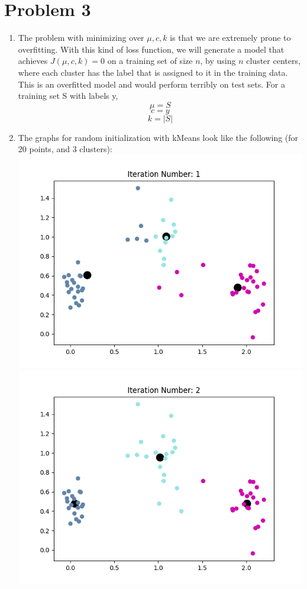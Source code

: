 \documentclass[11pt]{article}
\begin{document}
\section{Problem 3}
\begin{enumerate}
\item 
The problem with minimizing over $\mu, c, k$ is that we are extremely prone to overfitting. With this kind of
loss function, we will generate a model that achieves $J(\mu, c, k) = 0$ on a training set of size $n$, by 
using $n$ cluster centers, where each cluster has the label that is assigned to it in the training data. This
is an overfitted model and would perform terribly on test sets. \newline
For a training set S with labels y, \newline
$$\mu = S$$
$$c = y$$
$$k = |S|$$
\setcounter{enumi}{3}
\item 
The graphs for random initialization with kMeans look like the following (for 20 points, and 3 clusters): \newline
\includegraphics[scale=0.4]{means_1.png} 
\includegraphics[scale=0.4]{means_2.png} \newline

\end{enumerate}
\end{document}
